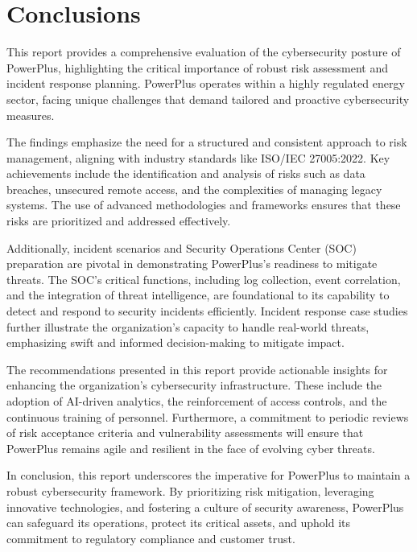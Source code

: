 \chapter{Conclusions}

This report provides a comprehensive evaluation of the cybersecurity posture of PowerPlus, highlighting the critical importance of robust risk assessment and incident response planning. PowerPlus operates within a highly regulated energy sector, facing unique challenges that demand tailored and proactive cybersecurity measures.

The findings emphasize the need for a structured and consistent approach to risk management, aligning with industry standards like ISO/IEC 27005:2022. Key achievements include the identification and analysis of risks such as data breaches, unsecured remote access, and the complexities of managing legacy systems. The use of advanced methodologies and frameworks ensures that these risks are prioritized and addressed effectively.

Additionally, incident scenarios and Security Operations Center (SOC) preparation are pivotal in demonstrating PowerPlus's readiness to mitigate threats. The SOC's critical functions, including log collection, event correlation, and the integration of threat intelligence, are foundational to its capability to detect and respond to security incidents efficiently. Incident response case studies further illustrate the organization's capacity to handle real-world threats, emphasizing swift and informed decision-making to mitigate impact.

The recommendations presented in this report provide actionable insights for enhancing the organization's cybersecurity infrastructure. These include the adoption of AI-driven analytics, the reinforcement of access controls, and the continuous training of personnel. Furthermore, a commitment to periodic reviews of risk acceptance criteria and vulnerability assessments will ensure that PowerPlus remains agile and resilient in the face of evolving cyber threats.

In conclusion, this report underscores the imperative for PowerPlus to maintain a robust cybersecurity framework. By prioritizing risk mitigation, leveraging innovative technologies, and fostering a culture of security awareness, PowerPlus can safeguard its operations, protect its critical assets, and uphold its commitment to regulatory compliance and customer trust.